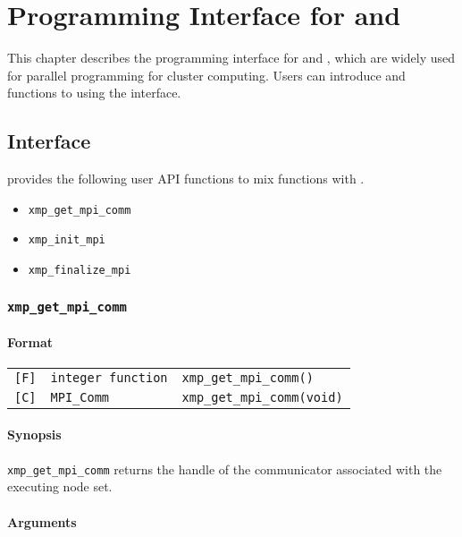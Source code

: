 \chapter{Programming Interface for {\MPI} and {\OMP}}

   This chapter describes the programming interface for {\MPI} and {\OMP},
   which are widely used for parallel programming for cluster computing.
   Users can introduce {\MPI} and {\OMP} functions to {\XMP} using the interface.   

\section{{\MPI} Interface}

   {\XMP} provides the following user API functions to mix {\MPI}
   functions with {\XMP}.

\begin{itemize}
\item {\tt xmp\_get\_mpi\_comm}
\item {\tt xmp\_init\_mpi}
\item {\tt xmp\_finalize\_mpi}
\end{itemize}

\subsection{\tt xmp\_get\_mpi\_comm}

\subsubsection*{Format}

\begin{tabular}{lll}
\verb![F]!&  {\tt integer function}& {\tt xmp\_get\_mpi\_comm()}\\
\verb![C]!&  {\tt MPI\_Comm}& {\tt xmp\_get\_mpi\_comm(void)}
\end{tabular}

\subsubsection*{Synopsis}

   {\tt xmp\_get\_mpi\_comm} returns the handle of the communicator
   associated with the executing node set. 

\subsubsection*{Arguments}

